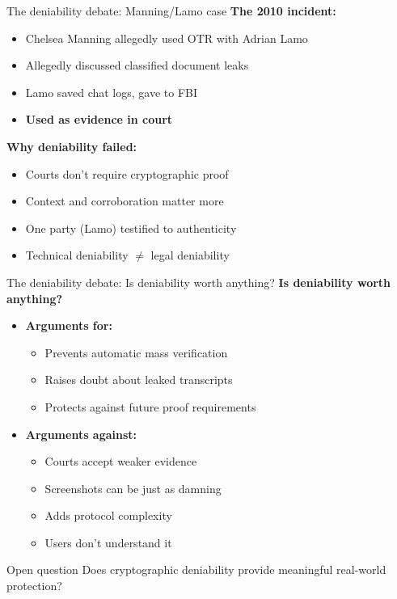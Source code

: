 \documentclass[aspectratio=169, lualatex, handout]{beamer}
\begin{document}
\begin{frame}{The deniability debate: Manning/Lamo case}
	\textbf{The 2010 incident:}
	\begin{itemize}
		\item Chelsea Manning allegedly used OTR with Adrian Lamo
		\item Allegedly discussed classified document leaks
		\item Lamo saved chat logs, gave to FBI
		\item \textbf{Used as evidence in court}
	\end{itemize}
	\textbf{Why deniability failed:}
	\begin{itemize}
		\item Courts don't require cryptographic proof
		\item Context and corroboration matter more
		\item One party (Lamo) testified to authenticity
		\item Technical deniability $\neq$ legal deniability
	\end{itemize}
\end{frame}

\begin{frame}{The deniability debate: Is deniability worth anything?}
	\textbf{Is deniability worth anything?}
	\begin{itemize}
		\item \textbf{Arguments for:}
		      \begin{itemize}
			      \item Prevents automatic mass verification
			      \item Raises doubt about leaked transcripts
			      \item Protects against future proof requirements
		      \end{itemize}
		\item \textbf{Arguments against:}
		      \begin{itemize}
			      \item Courts accept weaker evidence
			      \item Screenshots can be just as damning
			      \item Adds protocol complexity
			      \item Users don't understand it
		      \end{itemize}
	\end{itemize}
	\begin{alertblock}{Open question}
		Does cryptographic deniability provide meaningful real-world protection?
	\end{alertblock}
\end{frame}
\end{document}
